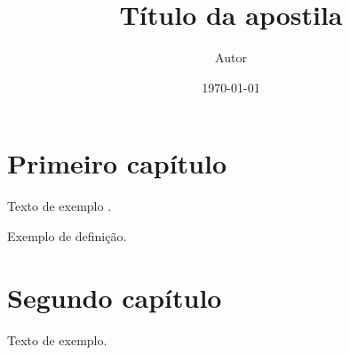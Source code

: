 \documentclass[11pt,a4paper,oneside]{report}
\title{Título da apostila}
\author{Autor}
\date{\today}
\begin{document}
\maketitle
\tableofcontents
\chapter{Primeiro capítulo}
Texto de exemplo \cite{exemplo2020}.
\begin{definicao}
Exemplo de definição.
\end{definicao}
\chapter{Segundo capítulo}
Texto de exemplo.


\end{document}
